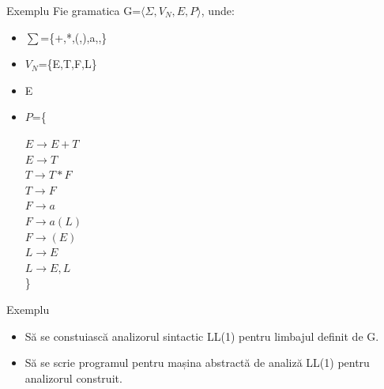 \documentclass[pdf]{beamer}
\begin{document}
\begin{frame}{Exemplu}
Fie gramatica G=$\langle \Sigma, V_N, E, P \rangle$, unde:

\begin{itemize}
\item
$\sum$=\{+,*,(,),a,,\}
\item
$V_N$=\{E,T,F,L\}
\item
E
\item
$P$=\{

\hspace{1cm}  $ E \rightarrow E+T$\\
\hspace{1cm}  $ E \rightarrow T$\\
\hspace{1cm}  $ T \rightarrow T*F$\\
\hspace{1cm}  $T \rightarrow F$\\
\hspace{1cm}  $ F \rightarrow a$\\
\hspace{1cm}  $ F \rightarrow a(L)$\\
\hspace{1cm}  $ F \rightarrow (E)$\\
\hspace{1cm}  $ L \rightarrow E$\\
\hspace{1cm}  $ L \rightarrow E,L$\\

\}
\end{itemize}
\end{frame}



\begin{frame}{Exemplu}
\begin{itemize}
\item
Să se constuiască analizorul sintactic LL(1) pentru limbajul definit de G.
\item
Să se scrie programul pentru mașina abstractă de analiză LL(1) pentru analizorul construit.
\end{itemize}
\end{frame}
\end{document}
